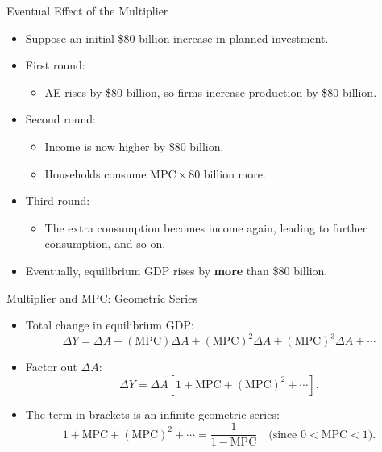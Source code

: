 \documentclass[aspectratio=169]{beamer}
\begin{document}
\begin{frame}{Eventual Effect of the Multiplier}
\transfade
\begin{itemize}[<+->]
  \item Suppose an initial \$80 billion increase in planned investment.
  \item First round:
  \begin{itemize}[<+->]
    \item AE rises by \$80 billion, so firms increase production by \$80 billion.
  \end{itemize}
  \item Second round:
  \begin{itemize}[<+->]
    \item Income is now higher by \$80 billion.
    \item Households consume \(\text{MPC} \times 80\) billion more.
  \end{itemize}
  \item Third round:
  \begin{itemize}[<+->]
    \item The extra consumption becomes income again, leading to further consumption, and so on.
  \end{itemize}
  \item Eventually, equilibrium GDP rises by \textbf{more} than \$80 billion.
\end{itemize}
\end{frame}

\begin{frame}{Multiplier and MPC: Geometric Series}
\transfade
\begin{itemize}[<+->]
  \item Total change in equilibrium GDP:
  \[
    \Delta Y = \Delta A
      + (\text{MPC}) \Delta A
      + (\text{MPC})^2 \Delta A
      + (\text{MPC})^3 \Delta A
      + \cdots
  \]
  \item Factor out \(\Delta A\):
  \[
    \Delta Y = \Delta A \left[ 1 + \text{MPC}
      + (\text{MPC})^2 + \cdots \right].
  \]
  \item The term in brackets is an infinite geometric series:
  \[
    1 + \text{MPC} + (\text{MPC})^2 + \cdots
    = \frac{1}{1 - \text{MPC}}
    \quad \text{(since } 0 < \text{MPC} < 1\text{)}.
  \]
\end{itemize}
\end{frame}
\end{document}
